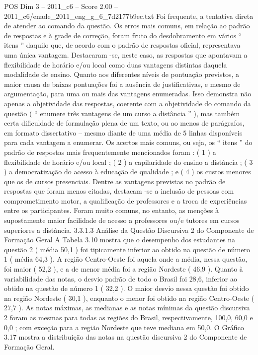 \begin{textsample}{POS Dim 3 – 2011\_c6 – Score 2.00 – 2011\_c6/enade\_2011\_eng\_g\_6\_7d2177b9ec.txt}
Foi frequente, a tentativa direta de atender ao comando da questão.
Os erros mais comuns, em relação ao padrão de respostas e à grade de correção, foram fruto do desdobramento em vários “ itens ” daquilo que, de acordo com o padrão de respostas oficial, representava uma única vantagem.
Destacaram -se, neste caso, as respostas que apontavam a flexibilidade de horário e/ou local como duas vantagens distintas daquela modalidade de ensino.
Quanto aos diferentes níveis de pontuação previstos, a maior causa de baixas pontuações foi a ausência de justificativas, e mesmo de argumentação, para uma ou mais das vantagens enumeradas.
Isso demonstra não apenas a objetividade das respostas, coerente com a objetividade do comando da questão ( “ enumere três vantagens de um curso a distância ” ), mas também certa dificuldade de formulação plena de um texto, ou ao menos de parágrafos, em formato dissertativo – mesmo diante de uma média de 5 linhas disponíveis para cada vantagem a enumerar.
Os acertos mais comuns, ou seja, os “ itens ” do padrão de respostas mais frequentemente mencionados foram : ( 1 ) a flexibilidade de horário e/ou local ; ( 2 ) a capilaridade do ensino a distância ; ( 3 ) a democratização do acesso à educação de qualidade ; e ( 4 ) os custos menores que os de cursos presenciais.
Dentre as vantagens previstas no padrão de respostas que foram menos citadas, destacam -se a inclusão de pessoas com comprometimento motor, a qualificação de professores e a troca de experiências entre os participantes.
Foram muito comuns, no entanto, as menções à supostamente maior facilidade de acesso a professores ou/e tutores em cursos superiores a distância. 3.3.1.3 Análise da Questão Discursiva 2 do Componente de Formação Geral A Tabela 3.10 mostra que o desempenho dos estudantes na questão 2 ( média 50,1 ) foi tipicamente inferior ao obtido na questão de número 1 ( média 64,3 ).
A região Centro-Oeste foi aquela onde a média, nessa questão, foi maior ( 52,2 ), e a de menor média foi a região Nordeste ( 46,9 ).
Quanto à variabilidade das notas, o desvio padrão de todo o Brasil foi 28,6, inferior ao obtido na questão de número 1 ( 32,2 ).
O maior desvio nessa questão foi obtido na região Nordeste ( 30,1 ), enquanto o menor foi obtido na região Centro-Oeste ( 27,7 ).
As notas máximas, as medianas e as notas mínimas da questão discursiva 2 foram as mesmas para todas as regiões do Brasil, respectivamente, 100,0, 60,0 e 0,0 ; com exceção para a região Nordeste que teve mediana em 50,0.
O Gráfico 3.17 mostra a distribuição das notas na questão discursiva 2 do Componente de Formação Geral.

\end{textsample}

